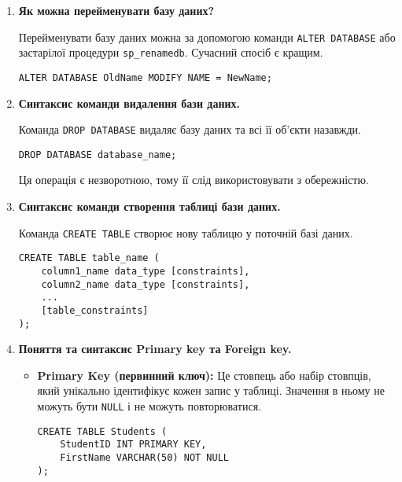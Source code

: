 \documentclass{article}
\begin{document}
\begin{enumerate}[label=\arabic*., leftmargin=*]
        \item \textbf{Як можна перейменувати базу даних?}

        Перейменувати базу даних можна за допомогою команди \texttt{ALTER DATABASE} або застарілої процедури \texttt{sp\_renamedb}. Сучасний спосіб є кращим.
        \begin{CodeBox}
        \begin{verbatim}
ALTER DATABASE OldName MODIFY NAME = NewName;
        \end{verbatim}
        \end{CodeBox}
        
        \item \textbf{Синтаксис команди видалення бази даних.}

        Команда \texttt{DROP DATABASE} видаляє базу даних та всі її об’єкти назавжди.
        \begin{CodeBox}[Синтаксис]
        \begin{verbatim}
DROP DATABASE database_name;
        \end{verbatim}
        \end{CodeBox}
        Ця операція є незворотною, тому її слід використовувати з обережністю.
        
        \item \textbf{Синтаксис команди створення таблиці бази даних.}

        Команда \texttt{CREATE TABLE} створює нову таблицю у поточній базі даних.
        \begin{CodeBox}[Синтаксис]
        \begin{verbatim}
CREATE TABLE table_name (
    column1_name data_type [constraints],
    column2_name data_type [constraints],
    ...
    [table_constraints]
);
        \end{verbatim}
        \end{CodeBox}
        
        \item \textbf{Поняття та синтаксис Primary key та Foreign key.}

        \begin{itemize}
            \item \textbf{Primary Key (первинний ключ):} Це стовпець або набір стовпців, який унікально ідентифікує кожен запис у таблиці. Значення в ньому не можуть бути \texttt{NULL} і не можуть повторюватися.
            \begin{CodeBox}
            \begin{verbatim}
CREATE TABLE Students (
    StudentID INT PRIMARY KEY,
    FirstName VARCHAR(50) NOT NULL
);
            \end{verbatim}
            \end{CodeBox}
            

\end{itemize}
\end{enumerate}
\end{document}
